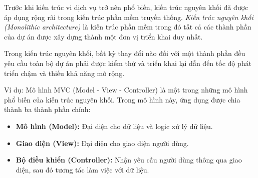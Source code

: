 Trước khi kiến trúc vi dịch vụ trở nên phổ biến, kiến trúc nguyên khối đã được áp dụng rộng rãi trong kiến trúc phần mềm truyền thống.  \emph{Kiến trúc nguyên khối (Monolithic architecture)} là kiến trúc phần mềm trong đó tất cả các thành phần của dự án được xây dựng thành một đơn vị triển khai duy nhất.

Trong kiến trúc nguyên khối, bất kỳ thay đổi nào đối với một thành phần đều yêu cầu toàn bộ dự án phải được kiểm thử và triển khai lại dẫn đến tốc độ phát triển chậm và thiếu khả năng mở rộng.

Ví dụ: Mô hình MVC (Model - View - Controller) là một trong những mô hình phổ biến  của kiến trúc nguyên khối. Trong mô hình này, ứng dụng được chia thành ba thành phần chính:

\begin{itemize}

\item \textbf{Mô hình (Model):} Đại diện cho dữ liệu và logic xử lý dữ liệu.

\item \textbf{Giao diện (View):} Đại diện cho giao diện người dùng.

\item \textbf{Bộ điều khiển (Controller):} Nhận yêu cầu người dùng thông qua giao diện, sau đó tương tác    làm việc với dữ liệu.

\end{itemize}